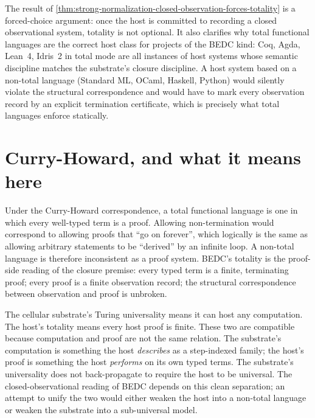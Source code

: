 \begin{remark}
\label{rem:strong-normalization-why-this-matters}
The result of \autoref{thm:strong-normalization-closed-observation-forces-totality} is a forced-choice argument: once the host is committed to recording a closed observational system, totality is not optional. It also clarifies why total functional languages are the correct host class for projects of the BEDC kind: Coq, Agda, Lean~4, Idris~2 in total mode are all instances of host systems whose semantic discipline matches the substrate's closure discipline. A host system based on a non-total language (Standard ML, OCaml, Haskell, Python) would silently violate the structural correspondence and would have to mark every observation record by an explicit termination certificate, which is precisely what total languages enforce statically.
\end{remark}

\section{Curry-Howard, and what it means here}
\label{sec:strong-normalization-curry-howard}

\begin{principle}
\label{prin:strong-normalization-curry-howard-reading}
Under the Curry-Howard correspondence, a total functional language is one in which every well-typed term is a proof. Allowing non-termination would correspond to allowing proofs that ``go on forever'', which logically is the same as allowing arbitrary statements to be ``derived'' by an infinite loop. A non-total language is therefore inconsistent as a proof system. BEDC's totality is the proof-side reading of the closure premise: every typed term is a finite, terminating proof; every proof is a finite observation record; the structural correspondence between observation and proof is unbroken.
\end{principle}

\begin{remark}
\label{rem:strong-normalization-universal-computation-vs-proof}
The cellular substrate's Turing universality means it can host any computation. The host's totality means every host proof is finite. These two are compatible because computation and proof are not the same relation. The substrate's computation is something the host \emph{describes} as a step-indexed family; the host's proof is something the host \emph{performs} on its own typed terms. The substrate's universality does not back-propagate to require the host to be universal. The closed-observational reading of BEDC depends on this clean separation; an attempt to unify the two would either weaken the host into a non-total language or weaken the substrate into a sub-universal model.
\end{remark}

